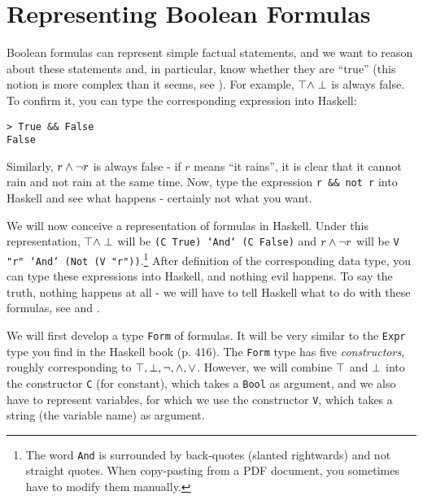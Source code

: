 \documentclass[english]{article}
\begin{document}
\section{Representing Boolean Formulas}

Boolean formulas can represent simple factual statements, and we want to
reason about these statements and, in particular, know whether they are
``true'' (this notion is more complex than it seems, see ).
For example, $\top \land \perp$ is always false. To confirm it, you can type the
corresponding expression into Haskell:

\begin{lstlisting}
> True && False
False
\end{lstlisting}

Similarly, $r \land \lnot r$ is always false - if $r$ means ``it rains'', it is
clear that it cannot rain and not rain at the same time. Now, type the
expression \texttt{r \&\& not r} into Haskell and see what happens - certainly
not what you want.

We will now conceive a representation of formulas in Haskell. Under this
representation, $\top \land \perp$ will be \texttt{(C True) `And` (C False)}
and $r \land \lnot r$ will be \texttt{V "r" `And` (Not (V "r"))}.\footnote{The
  word \texttt{And} is surrounded by back-quotes (slanted rightwards) and not
  straight quotes. When copy-pasting from a PDF document, you sometimes have
  to modify them manually.} After definition of the corresponding data type,
you can type these expressions into Haskell, and nothing evil happens. To say
the truth, nothing happens at all - we will have to tell Haskell what to do
with these formulas, see  and
.

We will first develop a type \texttt{Form} of formulas. It will be very similar
to the \texttt{Expr} type you find in the Haskell book (p. 416). The
\texttt{Form} type has five \emph{constructors}, roughly corresponding to
$\top, \perp, \lnot, \land, \lor$. However, we will combine $\top$ and
$\perp$ into the constructor \texttt{C} (for constant), which takes a
\texttt{Bool} as argument, and we also 
have to represent variables, for which we use the constructor \texttt{V},
which takes a string (the variable name) as argument. 
\end{document}
